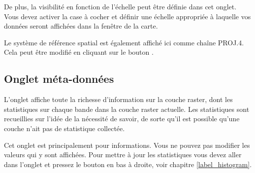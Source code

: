 De plus, la visibilité en fonction de l'échelle peut être définie dans cet
onglet. Vous devez activer la case à cocher et définir une échelle appropriée à laquelle vos données seront affichées dans la fenêtre de la carte.

Le système de référence spatial est également affiché ici comme chaîne PROJ.4. Cela peut être modifié en cliquant sur le bouton .

\subsection{Onglet méta-données}\label{label_metatab}

L'onglet  affiche toute la richesse d'information sur la
couche raster, dont les statistiques sur chaque bande dans la couche raster actuelle. Les statistiques sont recueillies sur l'idée de la nécessité de savoir, de sorte qu'il est possible qu'une couche n'ait pas de statistique collectée. 

Cet onglet est principalement pour informations. Vous ne pouvez pas modifier les valeurs qui y sont affichées. Pour mettre à jour les statistiques vous devez aller dans l'onglet  et pressez le bouton
 en bas à droite, voir chapitre \ref{label_histogram}.

